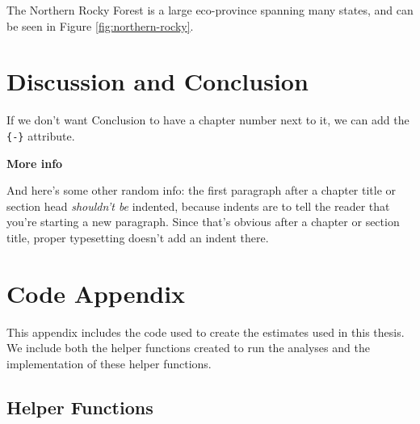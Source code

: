 \documentclass[12pt,twoside]{reedthesis}
\begin{document}
The Northern Rocky Forest is a large eco-province spanning many states, and can be seen in Figure \ref{fig:northern-rocky}.

\hypertarget{discussion-and-conclusion}{%
\chapter{Discussion and Conclusion}\label{discussion-and-conclusion}}

If we don't want Conclusion to have a chapter number next to it, we can add the \texttt{\{-\}} attribute.

\textbf{More info}

And here's some other random info: the first paragraph after a chapter title or section head \emph{shouldn't be} indented, because indents are to tell the reader that you're starting a new paragraph. Since that's obvious after a chapter or section title, proper typesetting doesn't add an indent there.

\appendix

\hypertarget{code-appendix}{%
\chapter{Code Appendix}\label{code-appendix}}

This appendix includes the code used to create the estimates used in this thesis. We include both the helper functions created to run the analyses and the implementation of these helper functions.

\hypertarget{helper-functions}{%
\section{Helper Functions}\label{helper-functions}}
\end{document}
